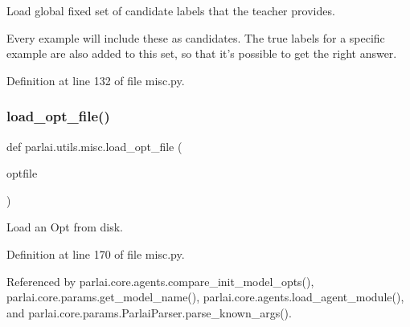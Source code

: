 \begin{DoxyVerb}Load global fixed set of candidate labels that the teacher provides.

Every example will include these as candidates. The true labels for a
specific example are also added to this set, so that it's possible to get
the right answer.
\end{DoxyVerb}
 

Definition at line 132 of file misc.\+py.

\mbox{\label{namespaceparlai_1_1utils_1_1misc_a7c97ef3250327bc549ac652a481be0cf}} 
\subsubsection{\texorpdfstring{load\+\_\+opt\+\_\+file()}{load\_opt\_file()}}
{\footnotesize\ttfamily def parlai.\+utils.\+misc.\+load\+\_\+opt\+\_\+file (\begin{DoxyParamCaption}\item[{}]{optfile }\end{DoxyParamCaption})}

\begin{DoxyVerb}Load an Opt from disk.\end{DoxyVerb}
 

Definition at line 170 of file misc.\+py.



Referenced by parlai.\+core.\+agents.\+compare\+\_\+init\+\_\+model\+\_\+opts(), parlai.\+core.\+params.\+get\+\_\+model\+\_\+name(), parlai.\+core.\+agents.\+load\+\_\+agent\+\_\+module(), and parlai.\+core.\+params.\+Parlai\+Parser.\+parse\+\_\+known\+\_\+args().

